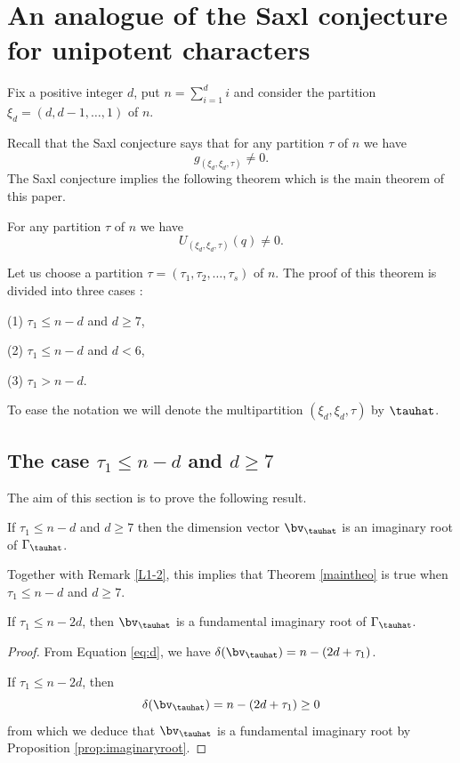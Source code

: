 \section{An analogue of the Saxl conjecture for unipotent characters}\label{s:mainthm}

Fix a positive integer $d$, put $n=\sum_{i=1}^d i$ and consider the partition  $\xi_d=(d,d-1, \ldots , 1)$ of $n$. 

Recall that the Saxl conjecture says that for any partition $\tau$ of $n$ we have
$$
g_{(\xi_d,\xi_d,\tau)}\neq 0.
$$
The Saxl conjecture implies the following theorem which is the main theorem of this paper.

\begin{theo}\label{thm:analoguesaxl}
	For any partition $\tau$ of $n$ we have  
	$$
	U_{(\xi_d,\xi_d,\tau)}(q)\neq  0.
	$$
	\label{maintheo}\end{theo}
Let us choose a partition $\tau=(\tau_1,\tau_2, \ldots, \tau_s)$ of $n$. The proof of this  theorem is divided into three cases : 

(1) $\tau_1\leq n-d$ and $d\geq 7$,

(2) $\tau_1 \leq n-d$ and $d<6$,

(3) $\tau_1>n-d$.



To ease the notation we will denote the multipartition $(\xi_d,\xi_d,\tau)$ by $\tauhat$.


\subsection{The case \texorpdfstring{$\tau_1\leq n-d$ and $d \geq 7$}{tau\_1 ≤ n-d and d ≥ 7}}


The aim of this section is to prove the following result.

\begin{prop} If $\tau_1\leq n-d$  and $d\geq 7$ then the dimension vector $\bv_\tauhat$ is an imaginary root of $\Gamma_\tauhat$.
	\label{theo1}\end{prop}

Together with Remark \ref{L1-2}, this implies that Theorem \ref{maintheo} is true when $\tau_1\leq n-d$ and $d\geq 7$.


\begin{lemm} If $\tau_1\leq n-2d$, then $\bv_\tauhat$ is a fundamental imaginary root of $\Gamma_\tauhat$.
\end{lemm}

\begin{proof}From Equation \eqref{eq:d}, we have $\delta(\bv_\tauhat)=n-(2d+\tau_1)$. 
	
	If $\tau_1\leq n-2d$, then 
	$$
	\delta(\bv_\tauhat)=n-(2d+\tau_1)\geq 0
	$$
	from which we deduce that $\bv_\tauhat$ is a fundamental imaginary root by Proposition \ref{prop:imaginaryroot}. 
\end{proof}


